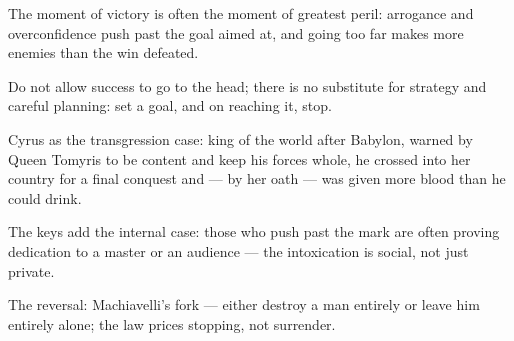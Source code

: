 

\begin{distilled}
  \item The moment of victory is often the moment of greatest peril: arrogance and overconfidence push past the goal aimed at, and going too far makes more enemies than the win defeated.
  \item Do not allow success to go to the head; there is no substitute for strategy and careful planning: set a goal, and on reaching it, stop.
  \item Cyrus as the transgression case: king of the world after Babylon, warned by Queen Tomyris to be content and keep his forces whole, he crossed into her country for a final conquest and --- by her oath --- was given more blood than he could drink.
  \item The keys add the internal case: those who push past the mark are often proving dedication to a master or an audience --- the intoxication is social, not just private.
  \item The reversal: Machiavelli's fork --- either destroy a man entirely or leave him entirely alone; the law prices stopping, not surrender.
\end{distilled}
